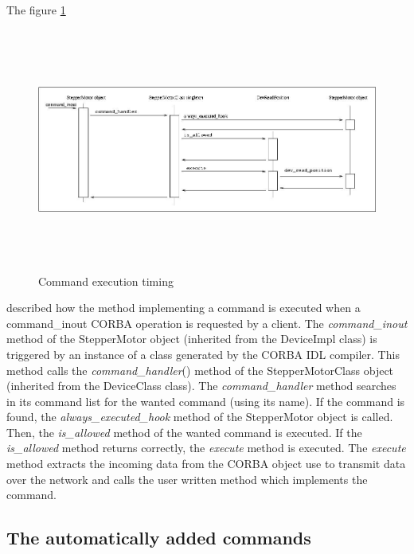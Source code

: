 The figure \ref{command_timing_fig}
\begin{figure}[H]
\begin{centering}
\includegraphics[width=14cm,height=8cm]{ds_writing/command}
\par\end{centering}

\protect\caption{Command execution timing\label{command_timing_fig}}
\end{figure}
 described how the method implementing a command is executed when
a command\_inout CORBA operation is requested
by a client. The \emph{command\_inout} method of the StepperMotor
object (inherited from the DeviceImpl class) is triggered by an instance
of a class generated by the CORBA IDL compiler. This
method calls the \emph{command\_handler}()
method of the StepperMotorClass object (inherited from the DeviceClass
class). The \emph{command\_handler} method searches in its command
list for the wanted command (using its name). If the command is found,
the \emph{always\_executed\_hook} method
of the StepperMotor object is called. Then, the \emph{is\_allowed}
method of the wanted command is executed. If the \emph{is\_allowed}
method returns correctly, the \emph{execute} method
is executed. The \emph{execute} method extracts the incoming data
from the CORBA object use to transmit data over the network and calls
the user written method which implements the command.


\subsection{The automatically added commands\label{Auto_cmd}}

